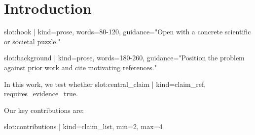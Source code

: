 \section{Introduction}

{{slot:hook | kind=prose, words=80-120, guidance="Open with a concrete scientific or societal puzzle."}}

{{slot:background | kind=prose, words=180-260, guidance="Position the problem against prior work and cite motivating references."}}

In this work, we test whether {{slot:central_claim | kind=claim_ref, requires_evidence=true}}.

Our key contributions are:
\begin{enumerate}
{{slot:contributions | kind=claim_list, min=2, max=4}}
\end{enumerate}
